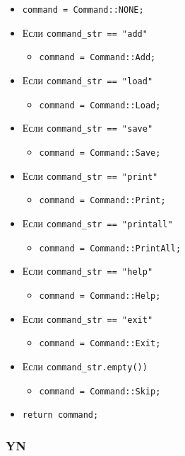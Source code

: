 \begin{itemize}
	\item \verb|command = Command::NONE;|
	\item Если \verb|command_str == "add"|
		\begin{itemize}
			\item \verb|command = Command::Add;|
		\end{itemize}
	\item Если \verb|command_str == "load"|
		\begin{itemize}
			\item \verb|command = Command::Load;|
		\end{itemize}
	\item Если \verb|command_str == "save"|
		\begin{itemize}
			\item \verb|command = Command::Save;|
		\end{itemize}
	\item Если \verb|command_str == "print"|
		\begin{itemize}
			\item \verb|command = Command::Print;|
		\end{itemize}
	\item Если \verb|command_str == "printall"|
		\begin{itemize}
			\item \verb|command = Command::PrintAll;|
		\end{itemize}
	\item Если \verb|command_str == "help"|
		\begin{itemize}
			\item \verb|command = Command::Help;|
		\end{itemize}
	\item Если \verb|command_str == "exit"|
		\begin{itemize}
			\item \verb|command = Command::Exit;|
		\end{itemize}
	\item Если \verb|command_str.empty())|
		\begin{itemize}
			\item \verb|command = Command::Skip;|
		\end{itemize}
	\item \verb|return command;|
\end{itemize}


\subsubsection*{YN}

